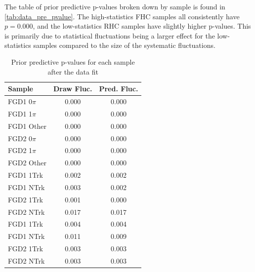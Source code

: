The table of prior predictive p-values broken down by sample is found in \autoref{tab:data_pre_pvalue}. The high-statistics FHC samples all consistently have $p=0.000$, and the low-statistics RHC samples have slightly higher p-values. This is primarily due to statistical fluctuations being a larger effect for the low-statistics samples compared to the size of the systematic fluctuations.
\begin{table}[h]
	\centering
	\begin{tabular}{l | c c }
		\hline \hline
		Sample & Draw Fluc. & Pred. Fluc. \\
		\hline
		FGD1 0$\pi$ & 0.000 & 0.000 \\
		FGD1 1$\pi$ & 0.000 & 0.000 \\
		FGD1 Other  & 0.000 & 0.000 \\
		\hline
		FGD2 0$\pi$ & 0.000 & 0.000 \\
		FGD2 1$\pi$ & 0.000 & 0.000 \\
		FGD2 Other  & 0.000 & 0.000 \\
		\hline
		FGD1 1Trk & 0.002 & 0.002 \\
		FGD1 NTrk & 0.003 & 0.002 \\
		FGD2 1Trk & 0.001 & 0.000 \\
		FGD2 NTrk & 0.017 & 0.017 \\
		\hline
		FGD1 \numu 1Trk & 0.004 & 0.004 \\
		FGD1 \numu NTrk & 0.011 & 0.009 \\
		FGD2 \numu 1Trk & 0.003 & 0.003 \\
		FGD2 \numu NTrk & 0.003 & 0.003 \\
		\hline
		\hline
	\end{tabular}
	\caption{Prior predictive p-values for each sample after the data fit}
	\label{tab:data_pre_pvalue}
\end{table}

